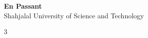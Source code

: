 \documentclass[8pt, a4paper]{extreport}
\begin{document}
\begin{center}
  {\huge \bfseries En Passant}\\[0.3em]
  {\large Shahjalal University of Science and Technology}\\[0.2em]
\end{center}

\begin{multicols*}{3}
  \tableofcontents
  \vspace*{8pt}

  
  
  
  
  
  
  
  
  
  
  
  
  
\end{multicols*}
\end{document}
